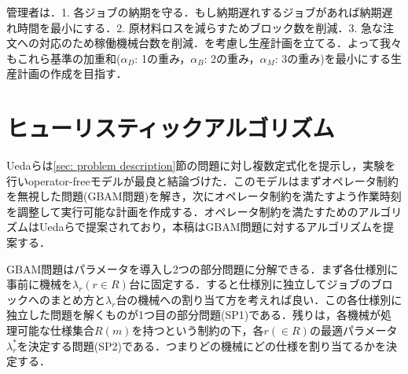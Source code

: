 \documentclass[twoside,twocolumn,11pt]{jarticle}  %
\begin{document}
管理者は．1. 各ジョブの納期を守る．もし納期遅れするジョブがあれば納期遅れ時間を最小にする．2. 原材料ロスを減らすためブロック数を削減．3. 急な注文への対応のため稼働機械台数を削減．を考慮し生産計画を立てる．よって我々もこれら基準の加重和($\alpha_D$: 1の重み，$\alpha_B$: 2の重み，$\alpha_M$: 3の重み)を最小にする生産計画の作成を目指す．

\section{ヒューリスティックアルゴリズム}
Uedaら\cite{Ueda2021}は\ref{sec: problem description}節の問題に対し複数定式化を提示し，実験を行いoperator-freeモデルが最良と結論づけた．このモデルはまずオペレータ制約を無視した問題(GBAM問題)を解き，次にオペレータ制約を満たすよう作業時刻を調整して実行可能な計画を作成する．オペレータ制約を満たすためのアルゴリズムはUedaらで提案されており，本稿はGBAM問題に対するアルゴリズムを提案する．

GBAM問題はパラメータを導入し2つの部分問題に分解できる．まず各仕様別に事前に機械を$\lambda_r (r \in R)$台に固定する．すると仕様別に独立してジョブのブロックへのまとめ方と$\lambda_r$台の機械への割り当て方を考えれば良い．この各仕様別に独立した問題を解くものが1つ目の部分問題(SP1)である．残りは，各機械が処理可能な仕様集合$R(m)$を持つという制約の下，各$r (\in R)$の最適パラメータ$\lambda^*_r$を決定する問題(SP2)である．つまりどの機械にどの仕様を割り当てるかを決定する．
\end{document}
